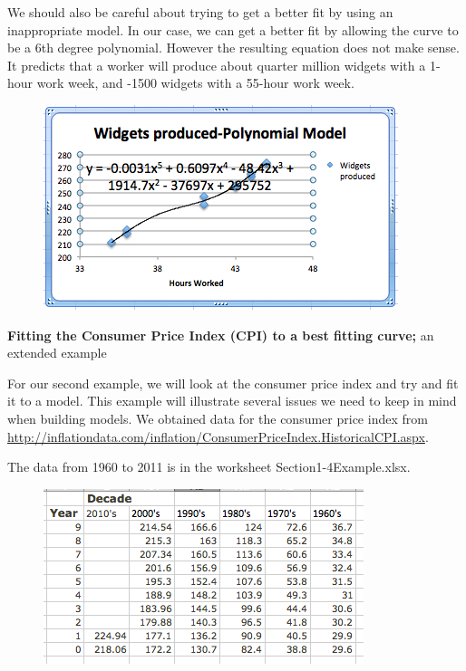 \documentclass[10pt,]{book}
\newcommand{\terminology}[1]{\textbf{#1}}
\theoremstyle{plain}
\theoremstyle{definition}
\theoremstyle{definition}
\begin{document}
%
\par
We should also be careful about trying to get a better fit by using an inappropriate model.  In our case, we can get a better fit by allowing the curve to be a 6th degree polynomial.  However the resulting equation does not make sense.  It predicts that a worker will produce about quarter million widgets with a 1-hour work week, and -1500 widgets with a 55-hour work week.

  \leavevmode%
\begin{figure}
\centering
\includegraphics[width=0.8\linewidth]{images/sec1-5-8.png}
\end{figure}
 

%
\par
\terminology{Fitting the Consumer Price Index (CPI) to a best fitting curve;} an extended example

%
\par
For our second example, we will look at the consumer price index and try and fit it to a model.  This example will illustrate several issues we need to keep in mind when building models.  We obtained data for the consumer price index from \href{http://inflationdata.com/inflation/Consumer_Price_Index.HistoricalCPI.aspx}{http://inflationdata.com/inflation/Consumer\textunderscore{}Price\textunderscore{}Index.HistoricalCPI.aspx}.  

%
\par
The data from 1960 to 2011 is in the worksheet Section1-4Example.xlsx.

  \leavevmode%
\begin{figure}
\centering
\includegraphics[width=0.8\linewidth]{images/sec1-5-9.png}
\end{figure}
 
\end{document}
